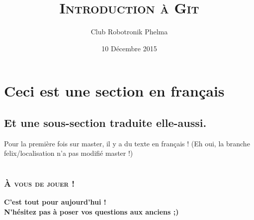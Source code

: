 \documentclass[10pt,a9paper,handout]{beamer}
\title{\textsc{Introduction à Git}}
\author{Club Robotronik Phelma}
\date{10 Décembre 2015}
\begin{document}
\setcounter{tocdepth}{1}
\begin{frame} \titlepage       \end{frame}
\begin{frame} \tableofcontents \end{frame}

\section{Ceci est une section en français}
\subsection{Et une sous-section traduite elle-aussi.}
\begin{frame}
Pour la première fois sur master, il y a du texte en français ! (Eh oui, la branche felix/localisation n'a pas modifié master !)
\end{frame}

\section{}
\subsection{}
\begin{frame}
\end{frame}

\section{}
\subsection{}
\begin{frame}

\end{frame}

\section{}
\subsection{}
\begin{frame}
\end{frame}


\begin{frame}
    \frametitle{\textsc{À vous de jouer  !}}
    \begin{center}
    \Large \textbf{C'est tout pour aujourd'hui !\\ N'hésitez pas à poser vos questions aux anciens ;) }
    \end{center}
\end{frame}
\end{document}
